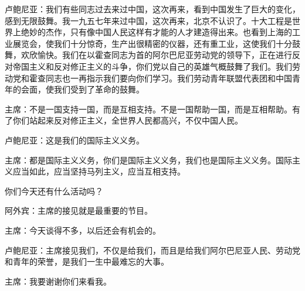 卢鲍尼亚：我们有些同志过去来过中国，这次再来，看到中国发生了巨大的变化，感到无限鼓舞。我一九五七年来过中国，这次再来，北京不认识了。十大工程是世界上绝妙的杰作，只有像中国人民这样有才能的人才建造得出来。也看到上海的工业展览会，使我们十分惊奇，生产出很精密的仪器，还有重工业，这使我们十分鼓舞，欢欣愉快。我们在以霍查同志为首的阿尔巴尼亚劳动党的领导下，正在进行反对帝国主义和反对修正主义的斗争，你们党以自己的英雄气概鼓舞了我们。我们劳动党和霍查同志也一再指示我们要向你们学习。我们劳动青年联盟代表团和中国青年的会面，使我们受到了革命的鼓舞。

主席：不是一国支持一国，而是互相支持。不是一国帮助一国，而是互相帮助。有了你们站起来反对修正主义，全世界人民都高兴，不仅中国人民。

卢鲍尼亚：这是我们的国际主义义务。

主席：都是国际主义义务，你们是国际主义义务，我们也是国际主义义务。国际主义应当如此，应当坚持马列主义，应当互相支持。

你们今天还有什么活动吗？

阿外宾：主席的接见就是最重要的节目。

主席：今天谈得不多，以后还会有机会的。

卢鲍尼亚：主席接见我们，不仅是给我们，而且是给我们阿尔巴尼亚人民、劳动党和青年的荣誉，是我们一生中最难忘的大事。

主席：我要谢谢你们来看我。

